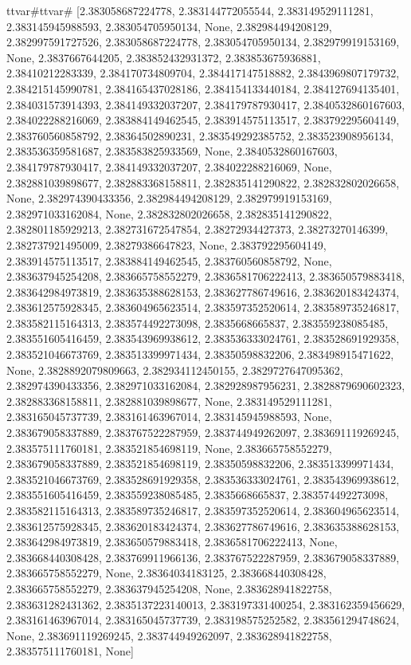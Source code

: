 \documentclass[
  11pt,
  french,
]{article}
\begin{document}
\begin{tcolorbox}[title= Répartition des volumes selon leurs caractéristiques ,colback=boitecode]
ttvar{#}ttvar{#} [2.383058687224778, 2.383144772055544, 2.383149529111281, 2.383145945988593, 2.383054705950134, None, 2.382984494208129, 2.382997591727526, 2.383058687224778, 2.383054705950134, 2.382979919153169, None, 2.3837667644205, 2.383852432931372, 2.383853675936881, 2.38410212283339, 2.384170734809704, 2.384417147518882, 2.3843969807179732, 2.384215145990781, 2.384165437028186, 2.384154133440184, 2.384127694135401, 2.384031573914393, 2.384149332037207, 2.384179787930417, 2.3840532860167603, 2.384022288216069, 2.383884149462545, 2.383914575113517, 2.383792295604149, 2.383760560858792, 2.38364502890231, 2.383549292385752, 2.383523908956134, 2.383536359581687, 2.383583825933569, None, 2.3840532860167603, 2.384179787930417, 2.384149332037207, 2.384022288216069, None, 2.382881039898677, 2.382883368158811, 2.382835141290822, 2.382832802026658, None, 2.382974390433356, 2.382984494208129, 2.382979919153169, 2.382971033162084, None, 2.382832802026658, 2.382835141290822, 2.382801185929213, 2.382731672547854, 2.38272934427373, 2.38273270146399, 2.382737921495009, 2.38279386647823, None, 2.383792295604149, 2.383914575113517, 2.383884149462545, 2.383760560858792, None, 2.383637945254208, 2.383665758552279, 2.3836581706222413, 2.383650579883418, 2.383642984973819, 2.383635388628153, 2.383627786749616, 2.383620183424374, 2.383612575928345, 2.383604965623514, 2.383597352520614, 2.383589735246817, 2.383582115164313, 2.383574492273098, 2.3835668665837, 2.383559238085485, 2.383551605416459, 2.383543969938612, 2.383536333024761, 2.383528691929358, 2.383521046673769, 2.383513399971434, 2.38350598832206, 2.383498915471622, None, 2.3828892079809663, 2.382934112450155, 2.3829727647095362, 2.382974390433356, 2.382971033162084, 2.382928987956231, 2.3828879690602323, 2.382883368158811, 2.382881039898677, None, 2.383149529111281, 2.383165045737739, 2.383161463967014, 2.383145945988593, None, 2.383679058337889, 2.383767522287959, 2.383744949262097, 2.383691119269245, 2.383575111760181, 2.383521854698119, None, 2.383665758552279, 2.383679058337889, 2.383521854698119, 2.38350598832206, 2.383513399971434, 2.383521046673769, 2.383528691929358, 2.383536333024761, 2.383543969938612, 2.383551605416459, 2.383559238085485, 2.3835668665837, 2.383574492273098, 2.383582115164313, 2.383589735246817, 2.383597352520614, 2.383604965623514, 2.383612575928345, 2.383620183424374, 2.383627786749616, 2.383635388628153, 2.383642984973819, 2.383650579883418, 2.3836581706222413, None, 2.383668440308428, 2.383769911966136, 2.383767522287959, 2.383679058337889, 2.383665758552279, None, 2.38364034183125, 2.383668440308428, 2.383665758552279, 2.383637945254208, None, 2.383628941822758, 2.383631282431362, 2.3835137223140013, 2.383197331400254, 2.383162359456629, 2.383161463967014, 2.383165045737739, 2.383198575252582, 2.383561294748624, None, 2.383691119269245, 2.383744949262097, 2.383628941822758, 2.383575111760181, None]

\end{tcolorbox}
\end{document}
